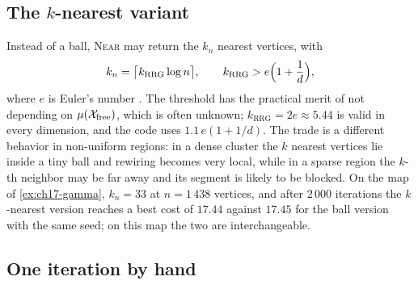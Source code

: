 \subsection{The $k$-nearest variant}
\label{sec:ch17-knn}

Instead of a ball, \textsc{Near} may return the $k_n$ nearest
vertices, with
\begin{equation}
  k_n=\bigl\lceil k_{\mathrm{RRG}}\log n\bigr\rceil,\qquad k_{\mathrm{RRG}}>e\Bigl(1+\frac1d\Bigr),
  \label{eq:ch17-knn}
\end{equation}
where $e$ is Euler's number \cite{karaman2011sampling}. The threshold has
the practical merit of not depending on $\mu(\mathcal{X}_{\mathrm{free}})$, which is often
unknown; $k_{\mathrm{RRG}}=2e\approx5.44$ is valid in every dimension, and
the code uses $1.1\,e(1+1/d)$. The trade is a different behavior in
non-uniform regions: in a dense cluster the $k$ nearest vertices lie inside
a tiny ball and rewiring becomes very local, while in a sparse region the
$k$-th neighbor may be far away and its segment is likely to be blocked.
On the map of \cref{ex:ch17-gamma}, $k_n=33$ at $n=1\,438$ vertices, and
after $2\,000$ iterations the $k$-nearest version reaches a best cost of
$17.44$ against $17.45$ for the ball version with the same seed; on this map
the two are interchangeable.

\subsection{One iteration by hand}
\label{sec:ch17-hand}


